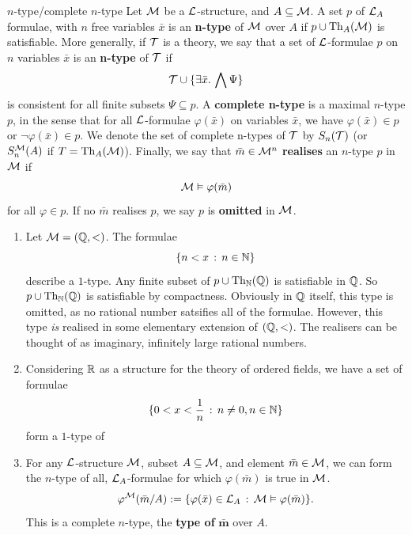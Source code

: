\documentclass{article}
\numberwithin{thm}{subsection}
\begin{document}
\begin{fancydefine}{$n$-type/complete $n$-type}\newlec
    Let $\mathcal{M}$ be a $\mathcal{L}$-structure, and $A \subseteq \mathcal{M}$. A set $p$ of $\mathcal{L}_{A}$ formulae, with $n$ free variables $\bar x$ is an \textbf{n-type} of $\mathcal{M}$ over $A$ if $p \cup \operatorname{Th}_{A}(\mathcal{M})$ is satisfiable. \gap
    More generally, if $\mathcal{T}$ is a theory, we say that a set of $\mathcal{L}$-formulae $p$ on $n$ variables $\bar x$ is an \textbf{n-type} of $\mathcal{T}$ if \[\mathcal{T} \cup \{\exists \bar x. \, \bigwedge \Psi \}\] is consistent for all finite subsets $\Psi \subseteq p$. \gap A \textbf{complete n-type} is a maximal $n$-type $p$, in the sense that for all $\mathcal{L}$-formulae $\varphi(\bar x)$ on variables $\bar x$, we have $\varphi(\bar x) \in p$ or $\neg \varphi(\bar x) \in p$. \gap We denote the set of complete n-types of $\mathcal{T}$ by $S_{n}(\mathcal{T})$ (or $S_{n}^{\mathcal{M}}(A)$ if $T = \operatorname{Th}_{A}(\mathcal{M})$). \gap Finally, we say that $\bar m \in \mathcal{M}^{n}$ \textbf{realises} an $n$-type $p$ in $\mathcal{M}$ if \[ \mathcal{M} \vDash \varphi(\bar m)\] for all $\varphi \in p$. If no $\bar m$ realises $p$, we say $p$ is \textbf{omitted} in $\mathcal{M}$.
\end{fancydefine}
\begin{ex}\hspace{0.1cm}
    \begin{enumerate}
        \item Let $\mathcal{M} = (\mathbb{Q}, <)$. The formulae \[ \{n < x \, : \, n \in \mathbb{N}\}\] describe a $1$-type. Any finite subset of $p \cup \operatorname{Th}_{\mathbb{N}}(\mathbb{Q})$ is satisfiable in $\mathbb{Q}$. So $p \cup \operatorname{Th}_{\mathbb{N}}(\mathbb{Q})$ is satisfiable by compactness. \gap 
        Obviously in $\mathbb{Q}$ itself, this type is omitted, as no rational number satsifies all of the formulae. However, this type \textit{is} realised in some elementary extension of $(\mathbb{Q}, <)$. The realisers can be thought of as imaginary, infinitely large rational numbers.
        \item Considering $\mathbb{R}$ as a structure for the theory of ordered fields, we have a set of formulae \[ \{0<x<\frac{1}{n} \, : \, n \neq 0, n \in \mathbb{N}\}\] form a $1$-type of 
        \item For any $\mathcal{L}$-structure $\mathcal{M}$, subset $A \subseteq \mathcal{M}$, and element $\bar m \in \mathcal{M}$, we can form the $n$-type of all, $\mathcal{L}_{A}$-formulae for which $\varphi(\bar m)$ is true in $\mathcal{M}$. \[ \varphi^{\mathcal{M}}(\bar m / A) := \{ \varphi( \bar x) \in \mathcal{L}_{A} \, : \, \mathcal{M} \vDash \varphi( \bar m ) \}. \]
        This is a complete $n$-type, the \textbf{type of }$\mathbf{\bar m}$ over $A$.
    \end{enumerate}
\end{ex}
\end{document}
